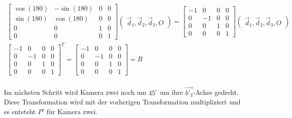 \begin{gather}
	\begin{bmatrix}
		\cos(180)&-\sin(180)&0&0\\
		\sin(180)&\cos(180)&0&0\\
		0&0&1&0\\
		0&0&0&1
	\end{bmatrix}
	\begin{pmatrix}
		\vec{d}_1,\vec{d}_2,\vec{d}_3,O
	\end{pmatrix}
	=
	\begin{bmatrix}
		-1&0&0&0\\
		0&-1&0&0\\
		0&0&1&0\\
		0&0&0&1
	\end{bmatrix} 
	\begin{pmatrix}
		\vec{d}_1,\vec{d}_2,\vec{d}_3,O
	\end{pmatrix}\\
	\begin{bmatrix}
		-1&0&0&0\\
		0&-1&0&0\\
		0&0&1&0\\
		0&0&0&1
	\end{bmatrix}^T =\begin{bmatrix}
	-1&0&0&0\\
	0&-1&0&0\\
	0&0&1&0\\
	0&0&0&1
	\end{bmatrix}= R
\end{gather}\\

Im nächsten Schritt wird Kamera zwei noch um \ensuremath{45^\circ} um ihre $\vec{b'_3}$-Achse gedreht. Diese Transformation wird mit der vorherigen Transformation multipliziert und es entsteht $P'$ für Kamera zwei.

